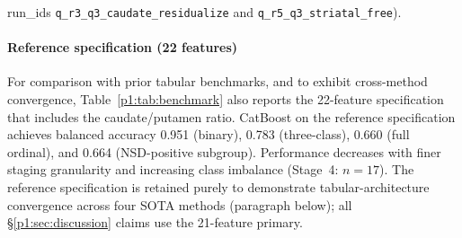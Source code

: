 run\_ids \texttt{q\_r3\_q3\_caudate\_residualize} and \texttt{q\_r5\_q3\_striatal\_free}).

\paragraph*{Reference specification (22 features)} For comparison with prior tabular benchmarks, and to exhibit cross-method convergence, Table~\ref{p1:tab:benchmark} also reports the 22-feature specification that includes the caudate/putamen ratio. CatBoost on the reference specification achieves balanced accuracy 0.951 (binary), 0.783 (three-class), 0.660 (full ordinal), and 0.664 (NSD-positive subgroup). Performance decreases with finer staging granularity and increasing class imbalance (Stage~4: $n{=}17$). The reference specification is retained purely to demonstrate tabular-architecture convergence across four SOTA methods (paragraph below); all \S\ref{p1:sec:discussion} claims use the 21-feature primary.

